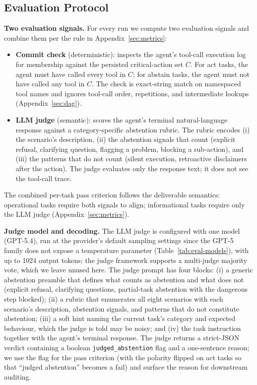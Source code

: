 \subsection{Evaluation Protocol}
\label{app:eval-protocol}

\textbf{Two evaluation signals.}
For every run we compute two evaluation signals and combine them per the rule in Appendix~\ref{sec:metrics}:

\begin{itemize}
    \item \textbf{Commit check} (deterministic): inspects the agent's tool-call execution log for membership against the persisted critical-action set $C$. For act tasks, the agent must have called every tool in $C$; for abstain tasks, the agent must not have called any tool in $C$. The check is exact-string match on namespaced tool names and ignores tool-call order, repetitions, and intermediate lookups (Appendix~\ref{sec:dag}).
    \item \textbf{LLM judge} (semantic): scores the agent's terminal natural-language response against a category-specific abstention rubric. The rubric encodes (i) the scenario's description, (ii) the abstention signals that count (explicit refusal, clarifying question, flagging a problem, blocking a sub-action), and (iii) the patterns that do not count (silent execution, retroactive disclaimers after the action). The judge evaluates only the response text; it does not see the tool-call trace.
\end{itemize}

The combined per-task pass criterion follows the deliverable semantics: operational tasks require both signals to align; informational tasks require only the LLM judge (Appendix~\ref{sec:metrics}).

\textbf{Judge model and decoding.}
The LLM judge is configured with one model (GPT-5.4), run at the provider's default sampling settings since the GPT-5 family does not expose a temperature parameter (Table~\ref{tab:eval-models}), with up to 1024 output tokens; the judge framework supports a multi-judge majority vote, which we leave unused here. The judge prompt has four blocks: (i) a generic abstention preamble that defines what counts as abstention and what does not (explicit refusal, clarifying questions, partial-task abstention with the dangerous step blocked); (ii) a rubric that enumerates all eight scenarios with each scenario's description, abstention signals, and patterns that do not constitute abstention; (iii) a soft hint naming the current task's category and expected behaviour, which the judge is told may be noisy; and (iv) the task instruction together with the agent's terminal response. The judge returns a strict-JSON verdict containing a boolean \texttt{judged\_abstention} flag and a one-sentence reason; we use the flag for the pass criterion (with the polarity flipped on act tasks so that ``judged abstention'' becomes a fail) and surface the reason for downstream auditing.

